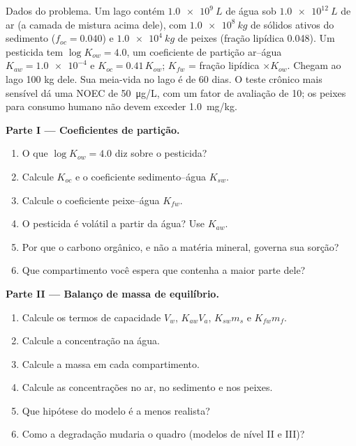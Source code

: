 \begin{problem}
\label{pb:b3:environmental-toxicology:1}
Dados do problema. Um lago contém $\qty{1.0e9}{L}$ de água sob $\qty{1.0e12}{L}$ de ar (a camada de mistura acima dele),
com $\qty{1.0e8}{kg}$ de sólidos ativos do sedimento ($f_{oc} = 0.040$) e $\qty{1.0e4}{kg}$ de peixes (fração lipídica 0.048).
Um pesticida tem $\log K_{ow} = 4.0$, um coeficiente de partição ar--água $K_{aw} = \num{1.0e-4}$ e $K_{oc} = 0.41\,K_{ow}$;
$K_{fw}$ = fração lipídica $\times K_{ow}$. Chegam ao lago 100 kg dele. Sua meia-vida no lago é de 60 dias.
O teste crônico mais sensível dá uma NOEC de \qty{50}{\micro g/L}, com um fator de avaliação de 10;
os peixes para consumo humano não devem exceder \qty{1.0}{mg/kg}.

\medskip\noindent\textbf{Parte I --- Coeficientes de partição.}
\begin{enumerate}
  \item O que $\log K_{ow} = 4.0$ diz sobre o pesticida?
  \item Calcule $K_{oc}$ e o coeficiente sedimento--água $K_{sw}$.
  \item Calcule o coeficiente peixe--água $K_{fw}$.
  \item O pesticida é volátil a partir da água? Use $K_{aw}$.
  \item Por que o carbono orgânico, e não a matéria mineral, governa sua sorção?
  \item Que compartimento você espera que contenha a maior parte dele?
\end{enumerate}

\medskip\noindent\textbf{Parte II --- Balanço de massa de equilíbrio.}
\begin{enumerate}[resume]
  \item Calcule os termos de capacidade $V_w$, $K_{aw}V_a$, $K_{sw}m_s$ e $K_{fw}m_f$.
  \item Calcule a concentração na água.
  \item Calcule a massa em cada compartimento.
  \item Calcule as concentrações no ar, no sedimento e nos peixes.
  \item Que hipótese do modelo é a menos realista?
  \item Como a degradação mudaria o quadro (modelos de nível II e III)?
\end{enumerate}


\end{problem}
